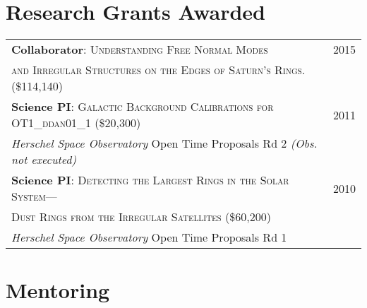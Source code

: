 \documentclass[10pt]{article} %
\begin{document}
{%

\section{Research Grants Awarded}

\begin{tabular}{l>{\hfill}p{2.45cm}}
{\bf Collaborator}: \textsc{Understanding Free Normal Modes} & 2015 \\
\textsc{ and Irregular Structures on the Edges of Saturn's Rings.} \footnotesize(\$114,140)\normalsize \\
{\bf Science PI}: \textsc{Galactic Background Calibrations for OT1\_ddan01\_1} \footnotesize(\$20,300)\normalsize & 2011 \\
{\it Herschel Space Observatory} Open Time Proposals Rd 2 {\it (Obs. not executed)} \\
{\bf Science PI}: \textsc{Detecting the Largest Rings in the Solar System---} & 2010 \\ 
\textsc{Dust Rings from the Irregular Satellites} \footnotesize(\$60,200)\normalsize \\
{\it Herschel Space Observatory} Open Time Proposals Rd 1 \\
\end{tabular}


\section{Mentoring}

\begin{tabular}{r|p{9.9cm}r}


\end{tabular}}
\end{document}
